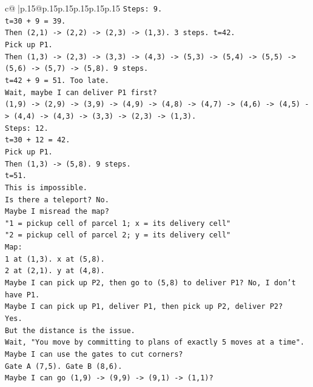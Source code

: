 \documentclass{article}
\begin{document}
{\begin{supertabular}{c@{$\;$}|p{.15\linewidth}@{}p{.15\linewidth}p{.15\linewidth}p{.15\linewidth}p{.15\linewidth}p{.15\linewidth}}
{{{\texttt{Steps: 9.} \\
\texttt{t=30 + 9 = 39.} \\
\texttt{Then (2,1) {-}> (2,2) {-}> (2,3) {-}> (1,3). 3 steps. t=42.} \\
\texttt{Pick up P1.} \\
\texttt{Then (1,3) {-}> (2,3) {-}> (3,3) {-}> (4,3) {-}> (5,3) {-}> (5,4) {-}> (5,5) {-}> (5,6) {-}> (5,7) {-}> (5,8). 9 steps.} \\
\texttt{t=42 + 9 = 51. Too late.} \\
\texttt{Wait, maybe I can deliver P1 first?} \\
\texttt{(1,9) {-}> (2,9) {-}> (3,9) {-}> (4,9) {-}> (4,8) {-}> (4,7) {-}> (4,6) {-}> (4,5) {-}> (4,4) {-}> (4,3) {-}> (3,3) {-}> (2,3) {-}> (1,3).} \\
\texttt{Steps: 12.} \\
\texttt{t=30 + 12 = 42.} \\
\texttt{Pick up P1.} \\
\texttt{Then (1,3) {-}> (5,8). 9 steps.} \\
\texttt{t=51.} \\
\texttt{This is impossible.} \\
\texttt{Is there a teleport? No.} \\
\texttt{Maybe I misread the map?} \\
\texttt{"1 = pickup cell of parcel 1; x = its delivery cell"} \\
\texttt{"2 = pickup cell of parcel 2; y = its delivery cell"} \\
\texttt{Map:} \\
\texttt{1 at (1,3). x at (5,8).} \\
\texttt{2 at (2,1). y at (4,8).} \\
\texttt{Maybe I can pick up P2, then go to (5,8) to deliver P1? No, I don't have P1.} \\
\texttt{Maybe I can pick up P1, deliver P1, then pick up P2, deliver P2?} \\
\texttt{Yes.} \\
\texttt{But the distance is the issue.} \\
\texttt{Wait, "You move by committing to plans of exactly 5 moves at a time".} \\
\texttt{Maybe I can use the gates to cut corners?} \\
\texttt{Gate A (7,5). Gate B (8,6).} \\
\texttt{Maybe I can go (1,9) {-}> (9,9) {-}> (9,1) {-}> (1,1)?} \\
}}}
\end{supertabular}}
\end{document}
